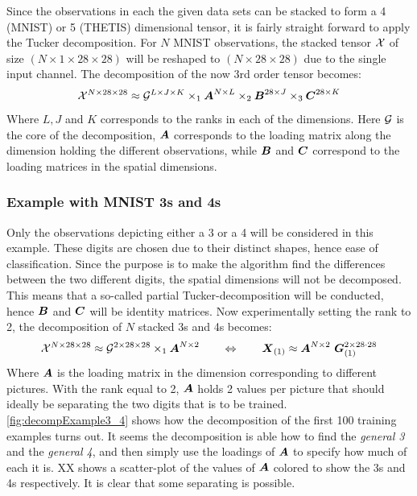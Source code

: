 Since the observations in each the given data sets can be stacked to form a 4 (MNIST) or 5 (THETIS) dimensional tensor, it is fairly straight forward to apply the Tucker decomposition. For $N$ MNIST observations, the stacked tensor $\mathcal{X}$ of size $(N \times 1 \times 28 \times 28)$ will be reshaped to $(N\times 28 \times 28)$ due to the single input channel. The decomposition of the now 3rd order tensor becomes:
\begin{equation}
    \mathcal{X}^{N\times 28 \times 28} \approx \mathcal{G}^{L\times J \times K} \times_1 \boldsymbol{A}^{N\times L} \times_2 \boldsymbol{B}^{28 \times J} \times_3 \boldsymbol{C}^{28 \times K}
\end{equation}
Where $L, J$ and $K$ corresponds to the ranks in each of the dimensions. Here $\mathcal{G}$ is the core of the decomposition, $\boldsymbol{A}$ corresponds to the loading matrix along the dimension holding the different observations, while $\boldsymbol{B}$ and $\boldsymbol{C}$ correspond to the loading matrices in the spatial dimensions.

\subsubsection{Example with MNIST 3s and 4s}
Only the observations depicting either a 3 or a 4 will be considered in this example. These digits are chosen due to their distinct shapes, hence ease of classification. Since the purpose is to make the algorithm find the differences between the two different digits, the spatial dimensions will not be decomposed. This means that a so-called partial Tucker-decomposition will be conducted, hence $\boldsymbol{B}$ and $\boldsymbol{C}$ will be identity matrices. Now experimentally setting the rank to 2, the decomposition of $N$ stacked 3s and 4s becomes:
\begin{equation}
    \tensor{X}^{N\times 28\times 28} \approx \tensor{G}^{2 \times 28 \times 28} \times_1 \bs{A}^{N\times 2} \qquad \Leftrightarrow \qquad \bs{X}_{(1)} \approx \bs{A}^{N\times 2} \ \bs{G}^{2 \times 28\cdot 28}_{(1)}
\end{equation}
Where $\boldsymbol{A}$ is the loading matrix in the dimension corresponding to different pictures. With the rank equal to 2, $\boldsymbol{A}$ holds 2 values per picture that should ideally be separating the two digits that is to be trained. \autoref{fig:decompExample3_4} shows how the decomposition of the first 100 training examples turns out. It seems the decomposition is able how to find the \textit{general 3} and the \textit{general 4}, and then simply use the loadings of $\boldsymbol{A}$ to specify how much of each it is. XX shows a scatter-plot of the values of $\boldsymbol{A}$ colored to show the 3s and 4s respectively. It is clear that some separating is possible. 

